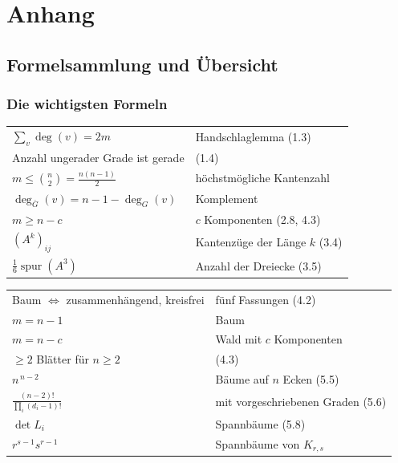\appendix
\part{Anhang}

\newcommand{\lit}[3]{\vspace{5pt}\noindent\textbf{[#1]} #2\par\nopagebreak\vspace{1pt}{\small\itshape\color{grau} #3}\par\vspace{2pt}}

\chapter{Formelsammlung und Übersicht}

\section{Die wichtigsten Formeln}

\begin{merksatz}
\begin{center}
{\small
\renewcommand{\arraystretch}{1.55}
\begin{tabular}{@{}P{4.2cm}P{4.4cm}@{}}
\toprule
$\sum_{v} \deg(v) = 2m$ & Handschlaglemma (1.3)\\
Anzahl ungerader Grade ist gerade & (1.4)\\
$m \le \binom{n}{2} = \frac{n(n-1)}{2}$ & höchstmögliche Kantenzahl\\
$\deg_{\overline G}(v) = n-1-\deg_G(v)$ & Komplement\\
$m \ge n - c$ & $c$ Komponenten (2.8, 4.3)\\
$(A^k)_{ij}$ & Kantenzüge der Länge $k$ (3.4)\\
$\frac16\operatorname{spur}(A^3)$ & Anzahl der Dreiecke (3.5)\\
\bottomrule
\end{tabular}}
\end{center}
\end{merksatz}

\begin{merksatz}
\begin{center}
{\small
\renewcommand{\arraystretch}{1.55}
\begin{tabular}{@{}P{4.2cm}P{4.4cm}@{}}
\toprule
Baum $\iff$ zusammenhängend, kreisfrei & fünf Fassungen (4.2)\\
$m = n-1$ & Baum\\
$m = n - c$ & Wald mit $c$ Komponenten\\
$\ge 2$ Blätter für $n \ge 2$ & (4.3)\\
$n^{\,n-2}$ & Bäume auf $n$ Ecken (5.5)\\
$\frac{(n-2)!}{\prod_i (d_i-1)!}$ & mit vorgeschriebenen Graden (5.6)\\
$\det L_i$ & Spannbäume (5.8)\\
$r^{s-1}s^{r-1}$ & Spannbäume von $K_{r,s}$\\
\bottomrule
\end{tabular}}
\end{center}
\end{merksatz}


